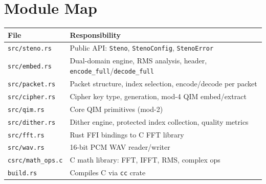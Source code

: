 \documentclass[11pt,a4paper]{article}
\begin{document}
\appendix
\section{Module Map}
\label{app:modules}

\begin{center}
\begin{tabular}{@{}ll@{}}
\toprule
File & Responsibility \\
\midrule
\texttt{src/steno.rs} & Public API: \texttt{Steno}, \texttt{StenoConfig}, \texttt{StenoError} \\
\texttt{src/embed.rs} & Dual-domain engine, RMS analysis, header, \texttt{encode\_full}/\texttt{decode\_full} \\
\texttt{src/packet.rs} & Packet structure, index selection, encode/decode per packet \\
\texttt{src/cipher.rs} & Cipher key type, generation, mod-4 QIM embed/extract \\
\texttt{src/qim.rs} & Core QIM primitives (mod-2) \\
\texttt{src/dither.rs} & Dither engine, protected index collection, quality metrics \\
\texttt{src/fft.rs} & Rust FFI bindings to C FFT library \\
\texttt{src/wav.rs} & 16-bit PCM WAV reader/writer \\
\texttt{csrc/math\_ops.c} & C math library: FFT, IFFT, RMS, complex ops \\
\texttt{build.rs} & Compiles C via \texttt{cc} crate \\
\bottomrule
\end{tabular}
\end{center}
\end{document}
